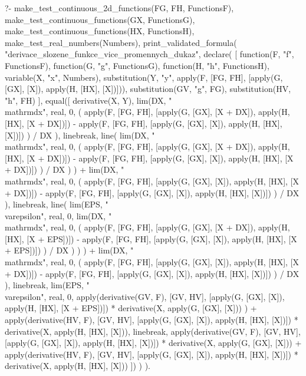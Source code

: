 \begin{prolog}
?-	make_test_continuous_2d_functions(FG, FH, FunctionsF),
	make_test_continuous_functions(GX, FunctionsG),
	make_test_continuous_functions(HX, FunctionsH),
	make_test_real_numbers(Numbers),
	print_validated_formula(
		"derivace_slozene_funkce_vice_promennych_dukaz",
		declare(
			[
				function(F, "f", FunctionsF),
				function(G, "g", FunctionsG),
				function(H, "h", FunctionsH),
				variable(X, "x", Numbers),
				substitution(Y, "y", apply(F, [FG, FH], [apply(G, [GX], [X]), apply(H, [HX], [X])])),
				substitution(GV, "g", FG),   %
				substitution(HV, "h", FH)   %
			],
			equal([
				derivative(X, Y),
				lim(DX, "\\mathrm{d}x", real, 0,
					(
						apply(F, [FG, FH], [apply(G, [GX], [X + DX]), apply(H, [HX], [X + DX])]) -
						apply(F, [FG, FH], [apply(G, [GX], [X]), apply(H, [HX], [X])])
					) / DX
				),
				linebreak,
				line(
					lim(DX, "\\mathrm{d}x", real, 0,
						(
							apply(F, [FG, FH], [apply(G, [GX], [X + DX]), apply(H, [HX], [X + DX])]) -
							apply(F, [FG, FH], [apply(G, [GX], [X]), apply(H, [HX], [X + DX])])
						) / DX
					)
				) + 
				lim(DX, "\\mathrm{d}x", real, 0,
					(
						apply(F, [FG, FH], [apply(G, [GX], [X]), apply(H, [HX], [X + DX])]) -
						apply(F, [FG, FH], [apply(G, [GX], [X]), apply(H, [HX], [X])])
					) / DX
				),
				linebreak,
				line(
					lim(EPS, "\\varepsilon", real, 0,
						lim(DX, "\\mathrm{d}x", real, 0,
							(
								apply(F, [FG, FH], [apply(G, [GX], [X + DX]), apply(H, [HX], [X + EPS])]) -
								apply(F, [FG, FH], [apply(G, [GX], [X]), apply(H, [HX], [X + EPS])])
							) / DX
						)
					)
				) + 
				lim(DX, "\\mathrm{d}x", real, 0,
					(
						apply(F, [FG, FH], [apply(G, [GX], [X]), apply(H, [HX], [X + DX])]) -
						apply(F, [FG, FH], [apply(G, [GX], [X]), apply(H, [HX], [X])])
					) / DX
				),
				linebreak,
				lim(EPS, "\\varepsilon", real, 0,
					apply(derivative(GV, F), [GV, HV], [apply(G, [GX], [X]), apply(H, [HX], [X + EPS])]) *
					derivative(X, apply(G, [GX], [X]))
				) + 
				apply(derivative(HV, F), [GV, HV], [apply(G, [GX], [X]), apply(H, [HX], [X])]) *
				derivative(X, apply(H, [HX], [X])),
				linebreak,
				apply(derivative(GV, F), [GV, HV], [apply(G, [GX], [X]), apply(H, [HX], [X])]) *
				derivative(X, apply(G, [GX], [X])) +
				apply(derivative(HV, F), [GV, HV], [apply(G, [GX], [X]), apply(H, [HX], [X])]) *
				derivative(X, apply(H, [HX], [X]))
			])
		)
	).
\end{prolog}


